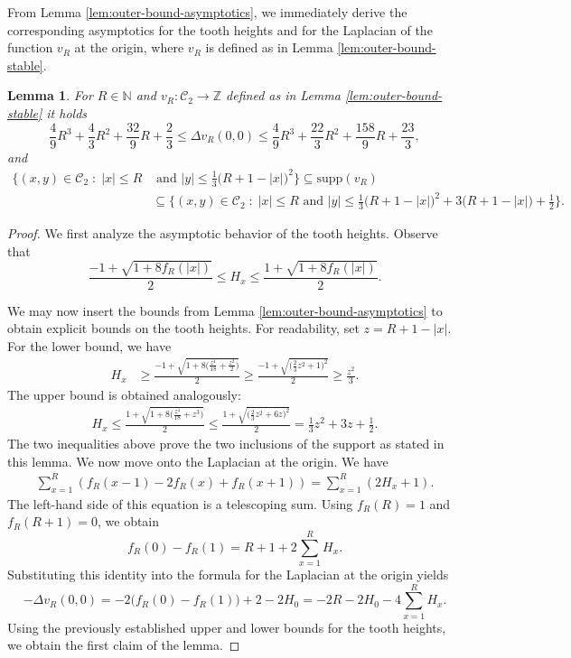 \documentclass[11pt]{article}
\newtheorem{lemma}{Lemma}[section]
\begin{document}
From Lemma \ref{lem:outer-bound-asymptotics}, we immediately derive the corresponding asymptotics for the tooth heights and for the Laplacian of the function $v_R$ at the origin, where $v_R$ is defined as in Lemma \ref{lem:outer-bound-stable}.

\begin{lemma}\label{lem:outer-bound-teeth-and-laplace}
For  $R\in\mathbb{N}$ and $v_R:\mathcal{C}_2\to\mathbb{Z}$ defined as in Lemma \ref{lem:outer-bound-stable} it holds
    $$\frac{4}{9}R^3+\frac{4}{3}R^2+\frac{32}{9}R+\frac{2}{3}\leq \Delta v_R(0,0)\leq \frac{4}{9}R^3+\frac{22}{3}R^2+\frac{158}{9}R+\frac{23}{3},$$
    and 
    \begin{align*}
    \Big\{(x,y)\in\mathcal{C}_2\;:\; \vert x\vert\leq R&\text{ and }\vert y\vert \leq \frac{1}{3}\big(R+1-|x|\big)^2\Big\}\subseteq \text{supp}(v_R)\\
    &\subseteq\Big\{(x,y)\in\mathcal{C}_2\;:\; \vert x\vert\leq R \text{ and } \vert y\vert \leq \frac{1}{3}\big(R+1-|x|\big)^2+3\big(R+1-|x|\big)+\frac{1}{2}\Big\}.\end{align*}
\end{lemma}
\begin{proof}
    We first analyze the asymptotic behavior of the tooth heights. Observe that
    \[
    \frac{-1+\sqrt{1+8f_R(|x|)}}{2}\leq H_x\leq \frac{1+\sqrt{1+8f_R(|x|)}}{2}.
    \]

  We may now insert the bounds from Lemma \ref{lem:outer-bound-asymptotics} to obtain explicit bounds on the tooth heights. For readability, set $z=R+1-|x|$. For the lower bound, we have
    \begin{align*}
        H_x&\geq\frac{-1+\sqrt{1+8\big(\frac{z^4}{18}+\frac{z^2}{2}\big)}}{2}\geq \frac{-1+\sqrt{\big(\frac{2}{3}z^2+1\big)^2}}{2}\geq \frac{z^2}{3}.
    \end{align*}
    The upper bound is obtained analogously:
    \begin{align*}
        H_x\leq \frac{1+\sqrt{1+8\big(\frac{z^4}{18}+z^3\big)}}{2}\leq \frac{1+\sqrt{\big(\frac{2}{3}z^2+6z\big)^2}}{2}=\frac{1}{3}z^2+3z+\frac{1}{2}.
    \end{align*}
    The two inequalities above prove the two inclusions of the support as stated in this lemma. We now move onto the Laplacian at the origin. We have
    \begin{align*}
        \sum_{x=1}^R \left(f_R({x-1})-2f_R(x)+f_R({x+1})\right)=\sum_{x=1}^R\left(2H_x+1\right).
    \end{align*}
    The left-hand side of this equation is a telescoping sum. Using $f_R(R)=1$ and $f_R(R+1)=0$, we obtain
    \[
    f_R(0)-f_R(1)=R+1+2\sum_{x=1}^R H_x.
    \]
Substituting this identity into the formula for the Laplacian at the origin yields
\[
-\Delta v_R(0,0)=-2\bigl(f_R(0)-f_R(1)\bigr)+2-2H_0=-2R-2H_0-4\sum_{x=1}^R H_x.
\]
Using the previously established upper and lower bounds for the tooth heights, we obtain
the first claim of the lemma.
\end{proof}
\end{document}
